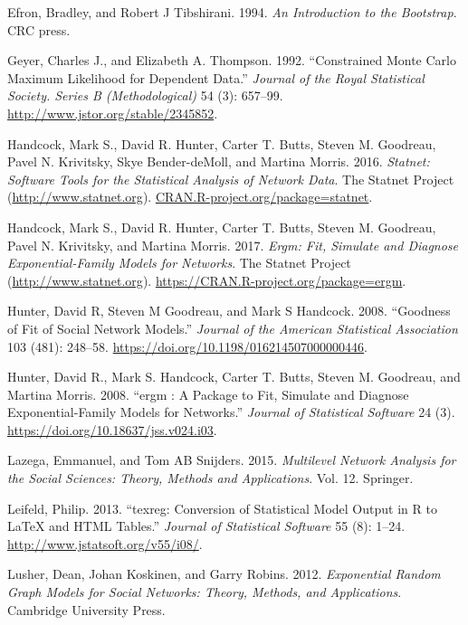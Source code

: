\documentclass[]{book}
\begin{document}
\leavevmode\hypertarget{ref-Efron1994}{}%
Efron, Bradley, and Robert J Tibshirani. 1994. \emph{An Introduction to the Bootstrap}. CRC press.

\leavevmode\hypertarget{ref-Geyer1992}{}%
Geyer, Charles J., and Elizabeth A. Thompson. 1992. ``Constrained Monte Carlo Maximum Likelihood for Dependent Data.'' \emph{Journal of the Royal Statistical Society. Series B (Methodological)} 54 (3): 657--99. \url{http://www.jstor.org/stable/2345852}.

\leavevmode\hypertarget{ref-R-statnet}{}%
Handcock, Mark S., David R. Hunter, Carter T. Butts, Steven M. Goodreau, Pavel N. Krivitsky, Skye Bender-deMoll, and Martina Morris. 2016. \emph{Statnet: Software Tools for the Statistical Analysis of Network Data}. The Statnet Project (\url{http://www.statnet.org}). \url{CRAN.R-project.org/package=statnet}.

\leavevmode\hypertarget{ref-R-ergm}{}%
Handcock, Mark S., David R. Hunter, Carter T. Butts, Steven M. Goodreau, Pavel N. Krivitsky, and Martina Morris. 2017. \emph{Ergm: Fit, Simulate and Diagnose Exponential-Family Models for Networks}. The Statnet Project (\url{http://www.statnet.org}). \url{https://CRAN.R-project.org/package=ergm}.

\leavevmode\hypertarget{ref-HunterJASA2008}{}%
Hunter, David R, Steven M Goodreau, and Mark S Handcock. 2008. ``Goodness of Fit of Social Network Models.'' \emph{Journal of the American Statistical Association} 103 (481): 248--58. \url{https://doi.org/10.1198/016214507000000446}.

\leavevmode\hypertarget{ref-Hunter2008}{}%
Hunter, David R., Mark S. Handcock, Carter T. Butts, Steven M. Goodreau, and Martina Morris. 2008. ``ergm : A Package to Fit, Simulate and Diagnose Exponential-Family Models for Networks.'' \emph{Journal of Statistical Software} 24 (3). \url{https://doi.org/10.18637/jss.v024.i03}.

\leavevmode\hypertarget{ref-lazega2015}{}%
Lazega, Emmanuel, and Tom AB Snijders. 2015. \emph{Multilevel Network Analysis for the Social Sciences: Theory, Methods and Applications}. Vol. 12. Springer.

\leavevmode\hypertarget{ref-R-texreg}{}%
Leifeld, Philip. 2013. ``texreg: Conversion of Statistical Model Output in R to LaTeX and HTML Tables.'' \emph{Journal of Statistical Software} 55 (8): 1--24. \url{http://www.jstatsoft.org/v55/i08/}.

\leavevmode\hypertarget{ref-lusher2012}{}%
Lusher, Dean, Johan Koskinen, and Garry Robins. 2012. \emph{Exponential Random Graph Models for Social Networks: Theory, Methods, and Applications}. Cambridge University Press.
\end{document}
